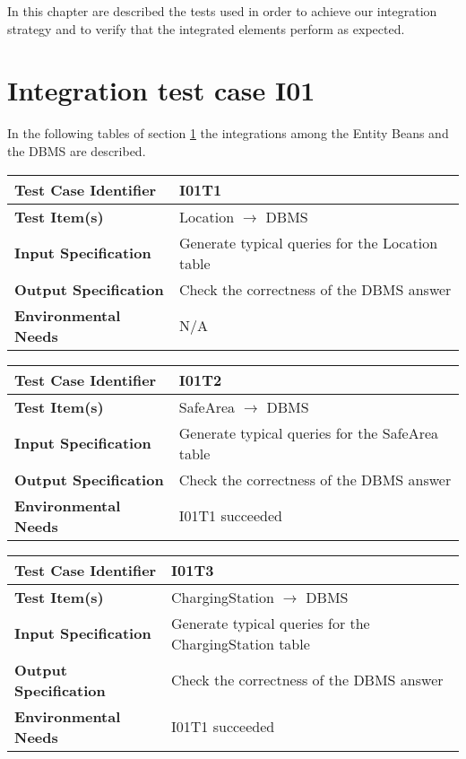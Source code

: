 In this chapter are described the tests used in order to achieve our integration strategy and to verify that the integrated elements perform as expected.

\section{Integration test case I01}\label{I01}
In the following tables of section \ref{I01} the integrations among the Entity Beans and the DBMS are described.
\begin{center}
	\vspace{0.6cm}
	\begin{tabular}{|l|l|}
		\hline
		\textbf{Test Case Identifier} & I01T1 \bigstrut \\\hline
		\textbf{Test Item(s)} & Location \ensuremath{\rightarrow} DBMS \bigstrut \\\hline
		\textbf{Input Specification} & Generate typical queries for the Location table \bigstrut \\\hline
		\textbf{Output Specification} & Check the correctness of the DBMS answer \bigstrut \\\hline
		\textbf{Environmental Needs} & N/A \bigstrut \\\hline
	\end{tabular}
\end{center}

\begin{center}
	\vspace{0.6cm}
	\begin{tabular}{|l|l|}
		\hline
		\textbf{Test Case Identifier} & I01T2 \bigstrut \\\hline
		\textbf{Test Item(s)} & SafeArea \ensuremath{\rightarrow} DBMS \bigstrut \\\hline
		\textbf{Input Specification} & Generate typical queries for the SafeArea table \bigstrut \\\hline
		\textbf{Output Specification} & Check the correctness of the DBMS answer \bigstrut \\\hline
		\textbf{Environmental Needs} & I01T1 succeeded\bigstrut \\\hline
	\end{tabular}
\end{center}

\begin{center}
	\vspace{0.6cm}
	\begin{tabular}{|l|l|}
		\hline
		\textbf{Test Case Identifier} & I01T3 \bigstrut \\\hline
		\textbf{Test Item(s)} & ChargingStation \ensuremath{\rightarrow} DBMS \bigstrut \\\hline
		\textbf{Input Specification} & Generate typical queries for the ChargingStation table \bigstrut \\\hline
		\textbf{Output Specification} & Check the correctness of the DBMS answer \bigstrut \\\hline
		\textbf{Environmental Needs} & I01T1 succeeded\bigstrut \\\hline
	\end{tabular}
\end{center}

